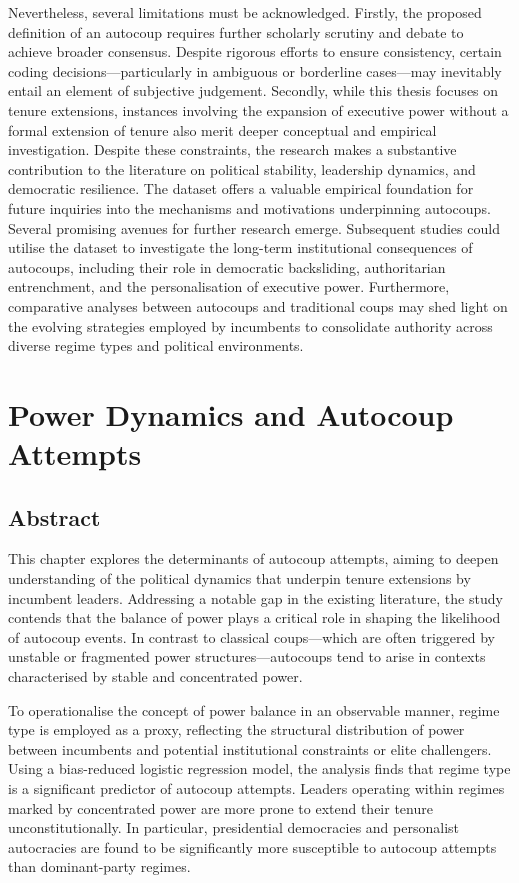 \documentclass[
  12pt,
]{report}
\begin{document}
Nevertheless, several limitations must be acknowledged. Firstly, the
proposed definition of an autocoup requires further scholarly scrutiny
and debate to achieve broader consensus. Despite rigorous efforts to
ensure consistency, certain coding decisions---particularly in ambiguous
or borderline cases---may inevitably entail an element of subjective
judgement. Secondly, while this thesis focuses on tenure extensions,
instances involving the expansion of executive power without a formal
extension of tenure also merit deeper conceptual and empirical
investigation. Despite these constraints, the research makes a
substantive contribution to the literature on political stability,
leadership dynamics, and democratic resilience. The dataset offers a
valuable empirical foundation for future inquiries into the mechanisms
and motivations underpinning autocoups. Several promising avenues for
further research emerge. Subsequent studies could utilise the dataset to
investigate the long-term institutional consequences of autocoups,
including their role in democratic backsliding, authoritarian
entrenchment, and the personalisation of executive power. Furthermore,
comparative analyses between autocoups and traditional coups may shed
light on the evolving strategies employed by incumbents to consolidate
authority across diverse regime types and political environments.

\chapter{Power Dynamics and Autocoup Attempts}\label{sec-chapter2}

\section*{Abstract}\label{abstract-2}

This chapter explores the determinants of autocoup attempts, aiming to
deepen understanding of the political dynamics that underpin tenure
extensions by incumbent leaders. Addressing a notable gap in the
existing literature, the study contends that the balance of power plays
a critical role in shaping the likelihood of autocoup events. In
contrast to classical coups---which are often triggered by unstable or
fragmented power structures---autocoups tend to arise in contexts
characterised by stable and concentrated power.

To operationalise the concept of power balance in an observable manner,
regime type is employed as a proxy, reflecting the structural
distribution of power between incumbents and potential institutional
constraints or elite challengers. Using a bias-reduced logistic
regression model, the analysis finds that regime type is a significant
predictor of autocoup attempts. Leaders operating within regimes marked
by concentrated power are more prone to extend their tenure
unconstitutionally. In particular, presidential democracies and
personalist autocracies are found to be significantly more susceptible
to autocoup attempts than dominant-party regimes.
\end{document}
